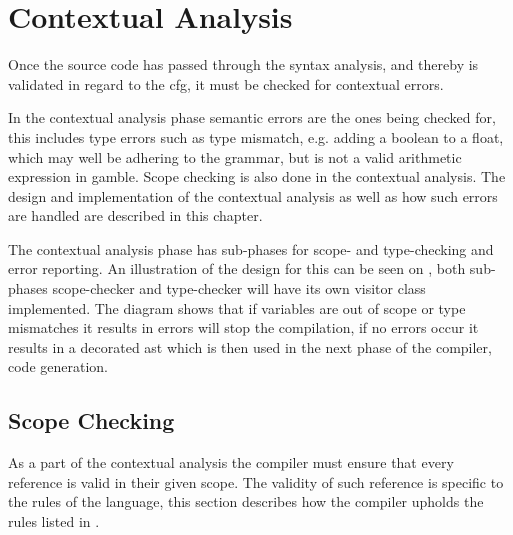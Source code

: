 \chapter{Contextual Analysis}
Once the source code has passed through the syntax analysis, and thereby is validated in regard to the \acrshort{cfg}, it must be checked for contextual errors.

In the contextual analysis phase semantic errors are the ones being checked for, this includes type errors such as type mismatch, e.g. adding a boolean to a float, which may well be adhering to the grammar, but is not a valid arithmetic expression in \gls{gamble}.
Scope checking is also done in the contextual analysis. 
The design and implementation of the contextual analysis as well as how such errors are handled are described in this chapter.

The contextual analysis phase has sub-phases for scope- and type-checking and error reporting.
An illustration of the design for this can be seen on , both sub-phases scope-checker and type-checker will have its own visitor class implemented.
The diagram shows that if variables are out of scope or type mismatches it results in errors will stop the compilation, if no errors occur it results in a decorated \acrshort{ast} which is then used in the next phase of the compiler, code generation.




%


\section{Scope Checking}
As a part of the contextual analysis the compiler must ensure that every reference is valid in their given scope.
The validity of such reference is specific to the rules of the language, this section describes how the compiler upholds the rules listed in .


